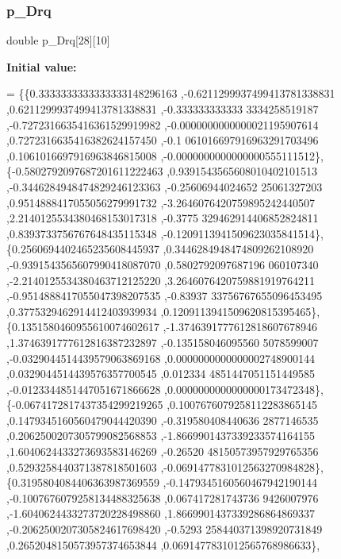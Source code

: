 \mbox{\label{a00993_a953daa2494cbd92ac4966af142cb12de}} 
\subsubsection{\texorpdfstring{p\+\_\+\+Drq}{p\_Drq}}
{\footnotesize\ttfamily double p\+\_\+\+Drq\mbox{[}28\mbox{]}\mbox{[}10\mbox{]}}

{\bfseries Initial value\+:}
\begin{DoxyCode}
= \{\{0.3333333333333333148296163 ,-0.6211299937499413781338831 ,0.6211299937499413781338831 ,-0.333333333333
      3334258519187 ,-0.7272316635416361529919982 ,-0.0000000000000021195907614 ,0.7272316635416382624157450 ,-0.1
      061016697916963291703496 ,0.1061016697916963846815008 ,-0.0000000000000000555111512\},
\{-0.5802792097687201611222463 ,0.9391543565608010402101513 ,-0.3446284948474829246123363 ,-0.25606944024652
      25061327203 ,0.9514888417055056279991732 ,-3.2646076420759895242440507 ,2.2140125534380468153017318 ,-0.3775
      329462914406852824811 ,0.8393733756767648435115348 ,-0.1209113941509623035841514\},
\{0.2560694402465235608445937 ,0.3446284948474809262108920 ,-0.9391543565607990418087070 ,0.5802792097687196
      060107340 ,-2.2140125534380463712125220 ,3.2646076420759881919764211 ,-0.9514888417055047398207535 ,-0.83937
      33756767655096453495 ,0.3775329462914412403939934 ,0.1209113941509620815395465\},
\{0.1351580460955610074602617 ,-1.3746391777612818607678946 ,1.3746391777612816387232897 ,-0.135158046095560
      5078599007 ,-0.0329044514439579063869168 ,0.0000000000000002748900144 ,0.0329044514439576357700545 ,0.012334
      4851447051151449585 ,-0.0123344851447051671866628 ,0.0000000000000000173472348\},
\{-0.0674172817437354299219265 ,0.1007676079258112283865145 ,0.1479345160560479044420390 ,-0.319580408440636
      2877146535 ,0.2062500207305799082568853 ,-1.8669901437339233574164155 ,1.6040624433273693583146269 ,-0.26520
      48150573957929765356 ,0.5293258440371387818501603 ,-0.0691477831012563270984828\},
\{0.3195804084406363987369559 ,-0.1479345160560467942190144 ,-0.1007676079258134488325638 ,0.067417281743736
      9426007976 ,-1.6040624433273720228498860 ,1.8669901437339286864869337 ,-0.2062500207305824617698420 ,-0.5293
      258440371398920731849 ,0.2652048150573957374653844 ,0.0691477831012565768986633\},

\end{DoxyCode}
